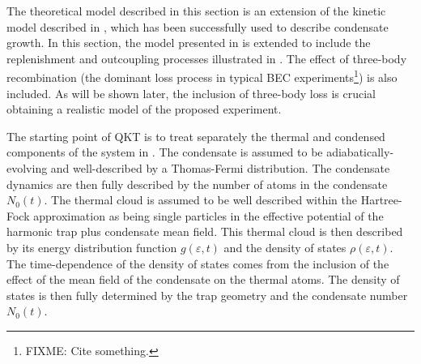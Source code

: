The theoretical model described in this section is an extension of the kinetic model described in \citet{Bijlsma:2000}, which has been successfully used to describe condensate growth. In this section, the model presented in \citep{Bijlsma:2000} is extended to include the replenishment and outcoupling processes illustrated in . The effect of three-body recombination (the dominant loss process in typical BEC experiments\footnote{FIXME: Cite something.}) is also included. As will be shown later, the inclusion of three-body loss is crucial obtaining a realistic model of the proposed experiment.

The starting point of QKT is to treat separately the thermal and condensed components of the system in . The condensate is assumed to be adiabatically-evolving and well-described by a Thomas-Fermi distribution. The condensate dynamics are then fully described by the number of atoms in the condensate $N_0(t)$. The thermal cloud is assumed to be well described within the Hartree-Fock approximation as being single particles in the effective potential of the harmonic trap plus condensate mean field. This thermal cloud is then described by its energy distribution function $g(\varepsilon, t)$ and the density of states $\rho(\varepsilon, t)$. The time-dependence of the density of states comes from the inclusion of the effect of the mean field of the condensate on the thermal atoms. The density of states is then fully determined by the trap geometry and the condensate number $N_0(t)$.

